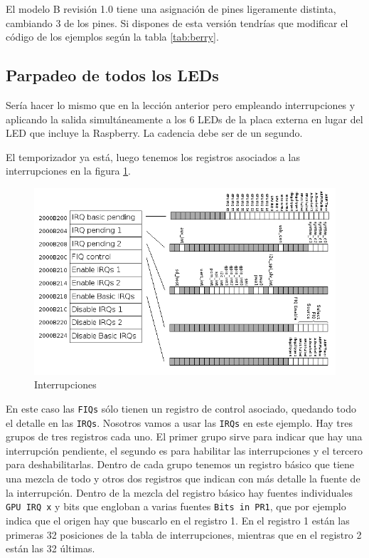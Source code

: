 El modelo B revisión 1.0 tiene una asignación de pines ligeramente distinta, cambiando 3 de
los pines. Si dispones de esta versión tendrías que modificar el código de los ejemplos
según la tabla \ref{tab:berry}.

\subsection{Parpadeo de todos los LEDs}

Sería hacer lo mismo que en la lección anterior pero empleando interrupciones y aplicando
la salida simultáneamente a los 6 LEDs de la placa externa en lugar del LED que incluye
la Raspberry. La cadencia debe ser de un segundo.

El temporizador ya está, luego tenemos los registros asociados a las interrupciones en la figura
\ref{fig:interrupciones}.

\begin{figure}[h]
  \centering
    \includegraphics[width=14cm]{graphs/interrupciones.png}
  \caption{Interrupciones}
  \label{fig:interrupciones}
\end{figure}

En este caso las {\tt FIQs} sólo tienen un registro de control asociado, quedando todo el detalle
en las {\tt IRQs}. Nosotros vamos a usar las {\tt IRQs} en este ejemplo. Hay tres grupos de tres
registros cada uno. El primer grupo sirve para indicar que hay una interrupción pendiente, el
segundo es para habilitar las interrupciones y el tercero para deshabilitarlas. Dentro de cada
grupo tenemos un registro básico que tiene una mezcla de todo y otros dos registros que
indican con más detalle la fuente de la interrupción. Dentro de la mezcla del registro básico
hay fuentes individuales {\tt GPU IRQ x} y bits que engloban a varias fuentes {\tt Bits in PR1},
que por ejemplo indica que el origen hay que buscarlo en el registro 1. En el registro 1 están
las primeras 32 posiciones de la tabla de interrupciones, mientras que en el registro 2 están
las 32 últimas.

